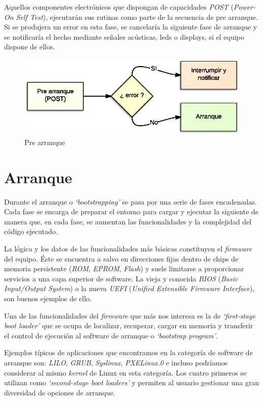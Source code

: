 \documentclass[a4paper,12pt,spanish,final]{epsc_tfc_pfc}
\begin{document}
Aquellos componentes electrónicos que dispongan de capacidades \emph{POST} (\emph{Power-On Self Test}), ejecutarán sus rutinas como parte de la secuencia de pre arranque. Si se produjera un error en esta fase, se cancelaría la siguiente fase de arranque y se notificaría el hecho mediante señales acústicas, leds o displays, si el equipo dispone de ellos.

\begin{figure}[h]
  \centering
    \includegraphics[scale=1]{pre_arranque}
      \caption{Pre arranque}
\end{figure}

\section{Arranque}
Durante el arranque o \emph{`bootstrapping'} se pasa por una serie de fases encadenadas. Cada fase se encarga de preparar el entorno para cargar y ejecutar la siguiente de manera que, en cada fase, se aumentan las funcionalidades y la complejidad del código ejecutado.

La lógica y los datos de las funcionalidades más básicas constituyen el \emph{firmware} del equipo. Éste se encuentra a salvo en direcciones fijas dentro de chips de memoria persistente (\emph{ROM}, \emph{EPROM}, \emph{Flash}) y suele limitarse a proporcionar servicios a una capa superior de software. La vieja y conocida \emph{BIOS} (\emph{Basic Input/Output System}) o la nueva \emph{UEFI} (\emph{Unified Extensible Firmware Interface}), son buenos ejemplos de ello.

Una de las funcionalidades del \emph{firmware} que más nos interesa es la de \emph{`first-stage boot loader'} que se ocupa de localizar, recuperar, cargar en memoria y transferir el control de ejecución al software de arranque o \emph{`bootstrap program'}.

Ejemplos típicos de aplicaciones que encontramos en la categoría de software de arranque son: \emph{LILO}, \emph{GRUB}, \emph{Syslinux}, \emph{PXELinux.0} e incluso podríamos considerar al mismo \emph{kernel} de Linux en esta categoría. Los cuatro primeros se utilizan como \emph{`second-stage boot loaders'} y permiten al usuario gestionar una gran diversidad de opciones de arranque.
\end{document}
